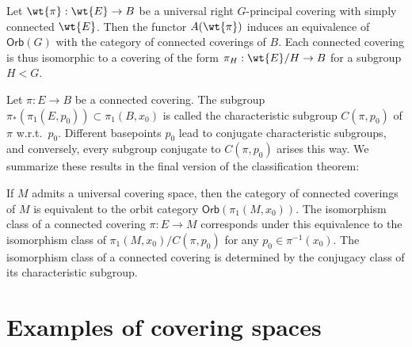 Let $\wt{\pi}:\wt{E}\to B$ be a universal right $G$-principal covering with simply connected $\wt{E}$. Then the functor $A(\wt{\pi})$ induces an equivalence of $\mathsf{Orb}(G)$ with the category of connected coverings of $B$. Each connected covering is thus isomorphic to a covering of the form $\pi_H:\wt{E}\slash H\to B$ for a subgroup $H<G$.

Let $\pi:E\to B$ be a connected covering. The subgroup $\pi_\ast(\pi_1(E,p_0))\subset \pi_1(B,x_0)$ is called the characteristic subgroup $C(\pi,p_0)$ of $\pi$ w.r.t.\ $p_0$. Different basepoints $p_0$ lead to conjugate characteristic subgroups, and conversely, every subgroup conjugate to $C(\pi,p_0)$ arises this way. We summarize these results in the final version of the classification theorem:

\begin{thm}
    If $M$ admits a universal covering space, then the category of connected coverings of $M$ is equivalent to the orbit category $\mathsf{Orb}(\pi_1(M,x_0))$. The isomorphism class of a connected covering $\pi:E\to M$ corresponds under this equivalence to the isomorphism class of $\pi_1(M,x_0)\slash C(\pi,p_0)$ for any $p_0\in\pi^{-1}(x_0)$. The isomorphism class of a connected covering is determined by the conjugacy class of its characteristic subgroup.
\end{thm}







\section{Examples of covering spaces}

